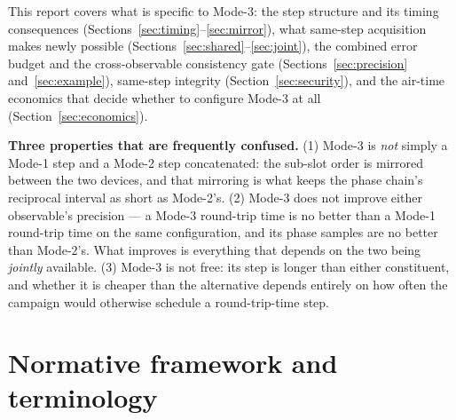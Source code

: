 \documentclass[11pt,a4paper]{article}
\begin{document}
This report covers what is specific to Mode-3: the step structure and its timing consequences
(Sections~\ref{sec:timing}--\ref{sec:mirror}), what same-step acquisition makes newly possible
(Sections~\ref{sec:shared}--\ref{sec:joint}), the combined error budget and the cross-observable
consistency gate (Sections~\ref{sec:precision} and~\ref{sec:example}), same-step integrity
(Section~\ref{sec:security}), and the air-time economics that decide whether to configure Mode-3 at
all (Section~\ref{sec:economics}).

\begin{callout}
\textbf{Three properties that are frequently confused.} (1) Mode-3 is \emph{not} simply a Mode-1 step
and a Mode-2 step concatenated: the sub-slot order is mirrored between the two devices, and that
mirroring is what keeps the phase chain's reciprocal interval as short as Mode-2's. (2) Mode-3 does
not improve either observable's precision --- a Mode-3 round-trip time is no better than a Mode-1
round-trip time on the same configuration, and its phase samples are no better than Mode-2's. What
improves is everything that depends on the two being \emph{jointly} available. (3) Mode-3 is not
free: its step is longer than either constituent, and whether it is cheaper than the alternative
depends entirely on how often the campaign would otherwise schedule a round-trip-time step.
\end{callout}
\section{Normative framework and terminology}
\end{document}
